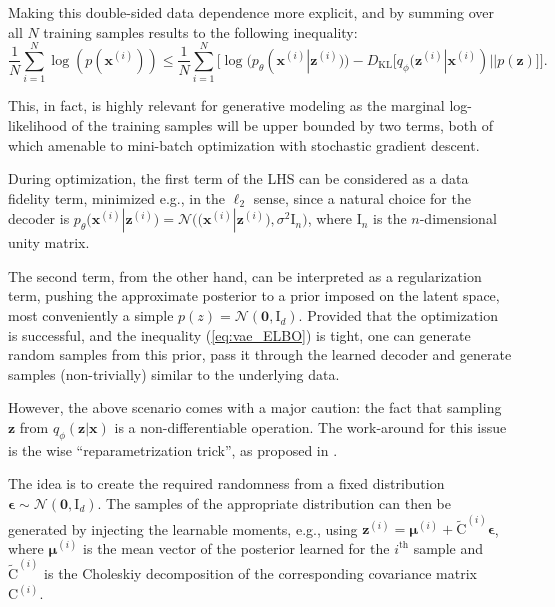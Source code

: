 \documentclass{article}
\begin{document}
Making this double-sided data dependence more explicit, and by summing over all $N$ training samples results to the following inequality:
\begin{equation} \label{eq:vae_ELBO}
\frac{1}{N}\sum_{i=1}^N \log(p(\mathbf{x}^{(i)})) \leqslant \frac{1}{N} \sum_{i=1}^N \Big[ \log(p_{\theta}(\mathbf{x}^{(i)}|\mathbf{z}^{(i)}))   -  D_{\text{KL}}\big[ q_{\phi}(\mathbf{z}^{(i)}  | \mathbf{x}^{(i)}) || p(\mathbf{z}) \big] \Big].
\end{equation}

This, in fact, is highly relevant for generative modeling as the marginal log-likelihood of the training samples will be upper bounded by two terms, both of which amenable to mini-batch optimization with stochastic gradient descent. 

During optimization, the first term of the LHS can be considered as a data fidelity term, minimized e.g., in the $\ell_2$ sense, since a natural choice for the decoder is $p_{\theta}(\mathbf{x}^{(i)}|\mathbf{z}^{(i)}) = \mathcal{N} \Big( \big( \mathbf{x}^{(i)}|\mathbf{z}^{(i)} \big) , \sigma^2 \mathrm{I}_n \Big)$, where $\mathrm{I}_n$ is the $n$-dimensional unity matrix.

The second term, from the other hand, can be interpreted as a regularization term, pushing the approximate posterior to a prior imposed on the latent space, most conveniently a simple $p(z) = \mathcal{N}(\mathbf{0}, \mathrm{I}_d)$. Provided that the optimization is successful, and the inequality (\ref{eq:vae_ELBO}) is tight, one can generate random samples from this prior, pass it through the learned decoder and generate samples (non-trivially) similar to the underlying data.   

However, the above scenario comes with a major caution: the fact that sampling $\mathbf{z}$ from $q_{\phi}(\mathbf{z} | \mathbf{x})$ is a non-differentiable operation. The work-around for this issue is the wise ``reparametrization trick'', as proposed in \cite{VAE}. 

The idea is to create the required randomness from a fixed distribution $\boldsymbol{\epsilon} \sim \mathcal{N}(\mathbf{0}, \mathrm{I}_d)$. The samples of the appropriate distribution can then be generated by injecting the learnable moments, e.g., using $\mathbf{z}^{(i)} = \boldsymbol{\mu}^{(i)} + \tilde{\mathrm{C}}^{(i)} \boldsymbol{\epsilon}$, where $\boldsymbol{\mu}^{(i)}$ is the mean vector of the posterior learned for the $i^{\text{th}}$ sample and $\tilde{\mathrm{C}}^{(i)}$ is the Choleskiy decomposition of the corresponding covariance matrix $\mathrm{C}^{(i)}$.
\end{document}
